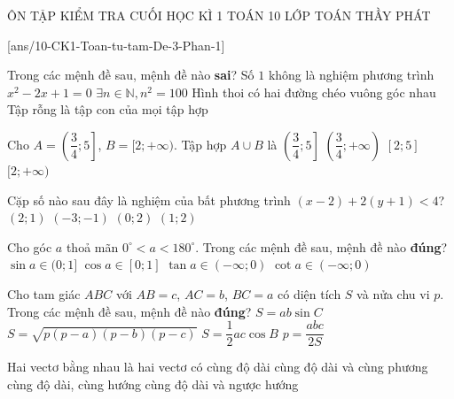 \begin{name}
	{ÔN TẬP KIỂM TRA CUỐI HỌC KÌ 1}
	{TOÁN 10}
	{LỚP TOÁN THẦY PHÁT}
	{\thoigian}
\end{name}

\caulc
{}[ans/10-CK1-Toan-tu-tam-De-3-Phan-1]

\begin{ex}
Trong các mệnh đề sau, mệnh đề nào \textbf{sai}?
\choice
{\True Số $1$ không là nghiệm phương trình $x^2-2x+1=0$}
{$\exists n \in \mathbb{N}, n^2=100$}
{Hình thoi có hai đường chéo vuông góc nhau}
{Tập rỗng là tập con của mọi tập hợp}
\end{ex}

\begin{ex}
Cho $A=\left(\dfrac{3}{4}; 5\right]$, $B=[2; +\infty)$. Tập hợp $A \cup B$ là
	\choice
	{$\left(\dfrac{3}{4}; 5\right]$}
	{\True $\left(\dfrac{3}{4}; +\infty\right)$}
	{$[2; 5]$}
	{$[2; +\infty)$}
	\loigiai{
	Ta có $A \cup B = \left(\dfrac{3}{4}; 5\right] \cup [2; +\infty) = \left(\dfrac{3}{4}; +\infty\right)$.
	}
\end{ex}

\begin{ex}%
Cặp số nào sau đây là nghiệm của bất phương trình $(x-2)+2(y+1)<4$?
	\choice
	{$(2;1)$}
	{\True $(-3;-1)$}
	{$(0;2)$}
	{$(1;2)$}
\end{ex}

\begin{ex}%
Cho góc $a$ thoả mãn $0^\circ<a<180^\circ$. Trong các mệnh đề sau, mệnh đề nào \textbf{đúng}? 
	\choice
	{\True $\sin a \in (0;1]$}
	{$\cos a \in [0;1]$}
	{$\tan a \in (-\infty;0)$}
	{$\cot a \in (-\infty;0)$}
	\loigiai{
		Vì $0^\circ<a<180^\circ$ nên $\sin a \in (0;1]$, $\cos a \in (-1;1)$, $\tan a \in \mathbb{R}$ (với $a \neq 90^\circ$) và $\cot a \in \mathbb{R}$.
	}
\end{ex}

\begin{ex}%
Cho tam giác $ABC$ với $AB=c$, $AC=b$, $BC=a$ có diện tích $S$ và nửa chu vi $p$. Trong các mệnh đề sau, mệnh đề nào \textbf{đúng}?
	\choice
	{$S=ab\sin C$}
	{\True $S=\sqrt{p(p-a)(p-b)(p-c)}$}
	{$S=\dfrac{1}{2}ac\cos B$}
	{$p=\dfrac{abc}{2S}$}
\end{ex}

\begin{ex}%
Hai vectơ bằng nhau là hai vectơ có
	\choice
	{cùng độ dài}
	{cùng độ dài và cùng phương}
	{\True cùng độ dài, cùng hướng}
	{cùng độ dài và ngược hướng}
\end{ex}


